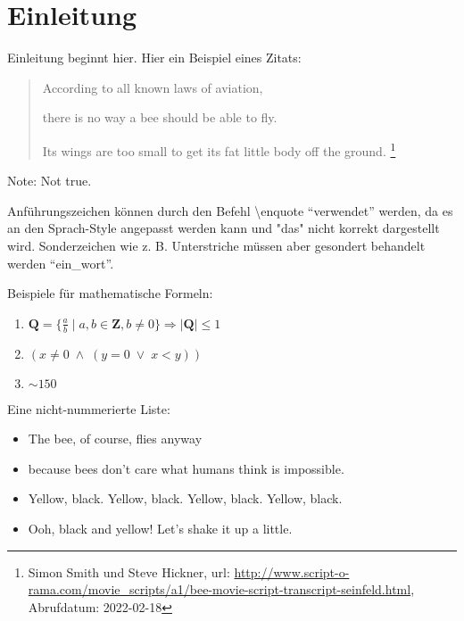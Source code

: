 \chapter{Einleitung}

Einleitung beginnt hier. 
Hier ein Beispiel eines Zitats:
\begin{quote}
According to all known laws
of aviation,

there is no way a bee
should be able to fly.

Its wings are too small to get
its fat little body off the ground.
\footnote{
Simon Smith und Steve Hickner, 
url: \url{http://www.script-o-rama.com/movie_scripts/a1/bee-movie-script-transcript-seinfeld.html}, 
Abrufdatum: 2022-02-18\cite{bee_movie}
}
\end{quote}
\vspace{-0.5cm} %
\begin{flushright}
{\footnotesize Note: Not true.} 
\end{flushright}

Anführungszeichen können durch den Befehl \textbackslash{}enquote \enquote{verwendet} werden, da es an den Sprach-Style angepasst werden kann und "das" nicht korrekt dargestellt wird.
Sonderzeichen wie z. B. Unterstriche müssen aber gesondert behandelt werden \enquote{ein\_wort}.

Beispiele für mathematische Formeln:
\begin{enumerate}
    \item $\mathbf{Q} = \{{\frac{a}{b}} \mid a,b \in \mathbf{Z} , b \neq 0\}
        \Rightarrow |\mathbf{Q}| \leq 1$
    \item $(x \neq 0 \; \land \; (y = 0 \; \lor \; x < y))$
    \item $\sim150$
\end{enumerate}

\clearpage %

Eine nicht-nummerierte Liste:
\begin{itemize}
    \setlength{\itemsep}{5pt}
    \setlength{\parskip}{0pt}
    \setlength{\parsep}{0pt}
    \item The bee, of course, flies anyway
    \item because bees don't care what humans think is impossible.
    \item Yellow, black. Yellow, black. Yellow, black. Yellow, black.
    \item Ooh, black and yellow! Let's shake it up a little.
\end{itemize}


